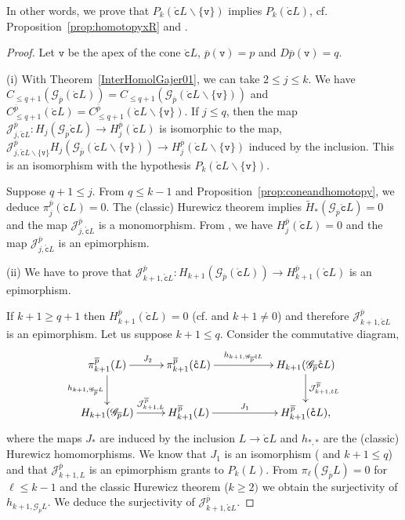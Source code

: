 \documentclass[a4paper,10pt,english,reqno]{amsart}
\theoremstyle{plain}
\theoremstyle{definition}
\theoremstyle{remark}
\numberwithin{equation}{section}
\newcommand{\thmref}[1]{Theorem~\ref{#1}}
\newcommand{\propref}[1]{Proposition~\ref{#1}}
\def\ov{\overline}
\def\cJ{{\mathcal J}}
\def\crG{{\mathscr G}}
\def\tc{{\mathtt c}}
\def\tv{{\mathtt v}}
\def\rc{{\mathring{\tc}}}
\def\menos{\backslash}
\renewcommand\1{\hbox{\ding{192}}}
\renewcommand\2{\hbox{\ding{193}}}
\newcommand\3{\hbox{\ding{194}}}
\newcommand\4{\hbox{\ding{195}}}
\begin{document}
In other words, we  prove that $P_k(\rc L \menos \{ \tv \})$ implies $P_k(\rc L)$, 
cf. \propref{prop:homotopyxR} and \cite[Corollary 1]{CST8}.



\begin{proof} 
Let $\tv$ be the apex of the cone $\rc L$, $\ov p(\tv)=p$ and $D\ov p(\tv) =q$.
%

(i) With \thmref{InterHomolGajer01},  we can take $2\leq j\leq k$. We have $C_{\leq q+1} (\crG_{\ov p} (\rc L)) = 
C_{\leq q+1} (\crG_{\ov p}(\rc L\menos \{ \tv\})) $ and $C_{\leq q+1}^{\ov p} (\rc L)= C_{\leq q+1}^{\ov p} (\rc L\menos \{ \tv\}) $.
If $j\leq q$, then the map   $\cJ_{j,\rc L}^{\ov{p}}\colon H_{j}(\crG_{\ov{p}}\rc L)\to H_{j}^{\ov{p}}(\rc L)$ 
is isomorphic to the map,
$\cJ_{j,\rc L\menos\{\tv\}}^{\ov{p}}H_j (\crG_{\ov{p}}( \rc L \menos \{ \tv \}))\to H_j^{\ov p}( \rc L \menos \{ \tv \})$
 induced by the inclusion. This is an isomorphism with the hypothesis $P_k( \rc L \menos \{ \tv \})$.

Suppose $ q+1 \leq j $. From $q\leq k-1$ and \propref{prop:coneandhomotopy}, we deduce $\pi^{\ov p}_{j} (\rc L)=0$.
The (classic) Hurewicz theorem implies $\widetilde H_*(\crG_{\ov p}\rc L)= 0$ and the map  $\cJ_{j,\rc L}^{\ov{p}}$ is a monomorphism.
From \cite[Proposition 3]{CST8}, we have $H_{j}^{\ov p} (\rc L)=0$ and the map  
$\cJ_{j,\rc L}^{\ov{p}}$ is an epimorphism.

(ii) We have to prove that $\cJ_{k+1,\rc L}^{\ov{p}}\colon H_{k+1}(\crG_{\ov{p}}(\rc L))\to H_{k+1}^{\ov{p}}(\rc L)$ is an epimorphism.

If $k+1\geq q+1$ then $ H_{k+1}^{\ov p} (\rc L) = 0$  (cf.  \cite[Proposition 3]{CST8} and $k+1\ne 0$) 
and therefore $\cJ_{k+1,\rc L}^{\ov{p}}$ is an epimorphism.
%
Let us suppose $k+1\leq q$. 
Consider the commutative diagram,
$$
\xymatrix{
\pi_{k+1}^{\ov p} ( L)\ar[r]^{J_2}   \ar[d]_-{h_{k+1, \crG_{\ov{p}}L}}
&
\pi_{k+1}^{\ov p} (\rc L)\ar[rr]^-{h_{k+1,\crG_{\ov{p}}\rc L}} 
&&
 H_{k+1}(\crG_{\ov p}\rc L) \ar[d]^-{\cJ_{k+1,\rc L}^{\ov{p}}}
  \\
    H_{k+1}(\crG_{\ov p}  L) \ar[r]^-{\cJ_{k+1,L}^{\ov{p}}}
    &
     H_{k+1}^{\ov p}( L)  \ar[rr]^-{J_1}
     &&  
   H_{k+1}^{\ov p}(\rc L),\\
}
$$
where the maps $J_{*}$ are induced by the inclusion $L\to \rc L$ and $h_{*,*}$ are the (classic) Hurewicz homomorphisms.
We know that $J_{1}$ is an isomorphism (\cite[Proposition 3]{CST8} and $k+1\leq q$) and that
$\cJ_{k+1,L}^{\ov{p}}$ is an epimorphism grants to $P_{k}(L)$.
%
From $\pi_{\ell}(\crG_{\ov{p}}L)=0$ for $\ell\leq k-1$ and the classic Hurewicz theorem ($k\geq 2)$ 
we obtain the surjectivity of
$h_{k+1,\crG_{\ov{p}}L}$.
%
We deduce the surjectivity of $\cJ_{k+1,\rc L}^{\ov{p}}$.
\end{proof}
\end{document}
